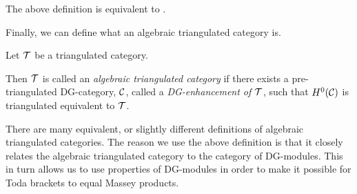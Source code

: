 The above definition is equivalent to \cite[Definition 3.1.1]{Jasso-Muro_2023}.

Finally, we can define what an algebraic triangulated category is.
\begin{definition}
    \label{def:alg_tri_cat}
    Let \( {\mathcal{T}} \) be a triangulated category.

    Then \( {\mathcal{T}} \) is called an \emph{algebraic triangulated category} if there exists a pre-triangulated DG-category, \( {\mathcal{C}} \), called a \emph{DG-enhancement of \( {\mathcal{T}} \)}, such that \( H^0({\mathcal{C}}) \) is triangulated equivalent to \( {\mathcal{T}} \).
\end{definition}

There are many equivalent, or slightly different definitions of algebraic triangulated categories. The reason we use the above definition is that it closely relates the algebraic triangulated category to the category of DG-modules. This in turn allows us to use properties of DG-modules in order to make it possible for Toda brackets to equal Massey products.
